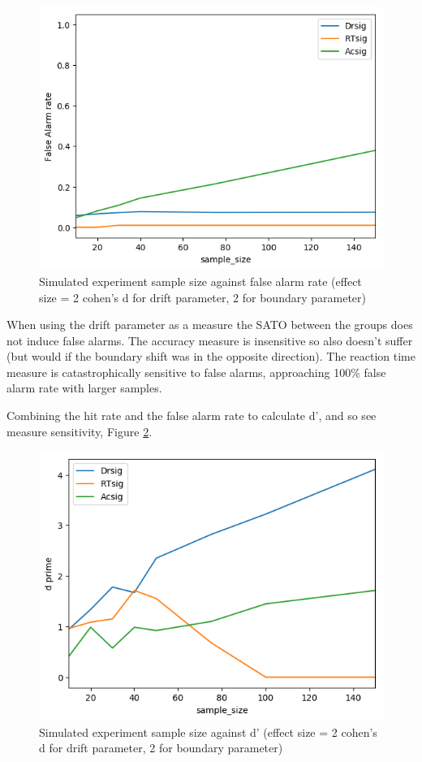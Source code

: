 \documentclass[floatsintext,doc]{apa6}
\theoremstyle{definition}
\theoremstyle{definition}
\theoremstyle{definition}
\theoremstyle{remark}
\begin{document}
\begin{figure}

{\centering \includegraphics[width=0.68\linewidth]{figs/SATO_FalseAlarms} 

}

\caption{Simulated experiment sample size against false alarm rate (effect size = 2 cohen's d for drift parameter, 2 for boundary parameter)}\label{fig:SATOFAs}
\end{figure}

When using the drift parameter as a measure the SATO between the groups
does not induce false alarms. The accuracy measure is insensitive so
also doesn't suffer (but would if the boundary shift was in the opposite
direction). The reaction time measure is catastrophically sensitive to
false alarms, approaching 100\% false alarm rate with larger samples.

Combining the hit rate and the false alarm rate to calculate d', and so
see measure sensitivity, Figure \ref{fig:SATOdprime}.

\begin{figure}

{\centering \includegraphics[width=0.68\linewidth]{figs/SATO_dprime} 

}

\caption{Simulated experiment sample size against d' (effect size = 2 cohen's d for drift parameter, 2 for boundary parameter)}\label{fig:SATOdprime}
\end{figure}
\end{document}
